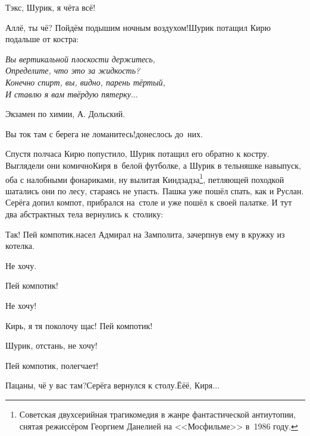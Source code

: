 \diagdash Тэк\sdash с, Шурик, я чёта всё!

\diagdash Аллё, ты чё? Пойдём подышим ночным воздухом!\mdash Шурик потащил Кирю подальше от костра:

\vspace{0.1cm}
\noindent\textit{%
	\hspace*{2.0cm}Вы вертикальной плоскости держитесь,\\	
	\hspace*{2.0cm}Определите, что это за жидкость?\\	
	\hspace*{2.0cm}Конечно спирт, вы, видно, парень тёртый,\\	
	\hspace*{2.0cm}И ставлю я вам твёрдую пятерку$\ldots$	
}

{\raggedleft \scriptsize \mdash Экзамен по химии, А. Дольский. \par}

\vspace{0.1cm}

\diagdash Вы ток там с берега не ломанитесь!\mdash донеслось до~них.

\renewcommand*{\thefootnote}{\fnsymbol{footnote}}
\setcounter{footnote}{0}
Спустя полчаса Кирю попустило, Шурик потащил его обратно к костру. Выглядели они комично\mdash Киря в~белой футболке, а Шурик в тельняшке навыпуск, оба с налобными фонариками, ну вылитая Кин\sdash дза\sdash дза\footnote{Советская двухсерийная трагикомедия в жанре фантастической антиутопии, снятая режиссёром Георгием Данелией на <<Мосфильме>> в~1986 году.}, петляющей походкой шатались они по лесу, стараясь не упасть. Пашка уже пошёл спать, как и Руслан. Серёга допил компот, прибрался на~столе и уже пошёл к своей палатке. И тут два абстрактных тела вернулись к~столику:

\diagdash Так! Пей компотик.\mdash насел Адмирал на Замполита, зачерпнув ему в кружку из котелка.

\diagdash Не хочу.

\diagdash Пей компотик!

\diagdash Не хочу!

\diagdash Кирь, я тя поколочу щас! Пей компотик!

\diagdash Шурик, отстань, не хочу!

\diagdash Пей компотик, полегчает!

\diagdash Пацаны, чё у вас там?\mdash Серёга вернулся к столу.\mdash Ё\sdash ё\sdash ё, Киря$\ldots$

